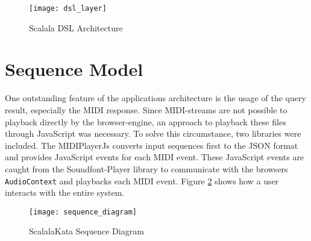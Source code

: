 \begin{figure}[h]
\caption{Scalala DSL Architecture}
\label{IMG_DSL_ARCH}
\texttt{[image: dsl\_layer]}
\end{figure}

\section{Sequence Model}
\label{ARCH_SEQ}
One outstanding feature of the applications architecture is the usage of the query result, especially the MIDI response. Since MIDI-streams are not possible to playback directly by the browser-engine, an approach to playback these files through JavaScript was necessary. To solve this circumstance, two libraries were included. The MIDIPlayerJs converts input sequences first to the JSON format and provides JavaScript events for each MIDI event. These JavaScript events are caught from the Soundfont-Player library to communicate with the browsers \texttt{AudioContext} and playbacks each MIDI event. Figure \ref{IMG_SEQ_ARCH} shows how a user interacts with the entire system.

\begin{figure}[h]
\caption{ScalalaKata Sequence Diagram}
\label{IMG_SEQ_ARCH}
\texttt{[image: sequence\_diagram]}
\end{figure}




















